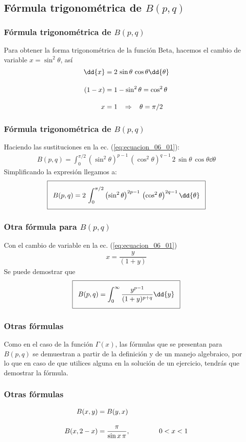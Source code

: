 \subsection{Fórmula trigonométrica de \texorpdfstring{$B(p,q)$}{B(p, q)}}
\begin{frame}
\frametitle{Fórmula trigonométrica de $B(p,q)$}
Para obtener la forma trigonométrica de la función Beta, hacemos el cambio de variable $x = \sin^{2} \theta$, así
\begin{align*}
\dd{x} &= 2 \, \sin \theta \, \cos \theta \dd{\theta} \\[1em]
(1 - x) &= 1 - \sin^{2} \theta = \cos^{2} \theta \\[1em]
x &= 1 \hspace{0.3cm} \Rightarrow \hspace{0.3cm} \theta = \pi/2
\end{align*}
\end{frame}
\begin{frame}
\frametitle{Fórmula trigonométrica de $B(p, q)$}
Haciendo las sustituciones en la ec. (\ref{eq:ecuacion_06_01}):
{\fontsize{12}{12}\selectfont
\begin{align}
B(p, q) = \int_{0}^{\pi/2} \left( \sin^{2} \theta \right)^{p-1} \, \left( \cos^{2} \theta \right)^{q-1} \, 2 \, \sin \theta \, \cos \theta \dd{\theta}
\end{align}}
\pause
Simplificando la expresión llegamos a:
{\fontsize{12}{12}\selectfont
\begin{align}
\addtolength{\fboxsep}{5pt}\boxed{B(p, q) = 2 \, \int_{0}^{\pi/2} \left( \sin^{2} \theta \right)^{2p-1} \, \left( \cos^{2} \theta \right)^{2q-1} \dd{\theta}}
\label{eq:ecuacion_06_04}
\end{align}}
\end{frame}
\begin{frame}
\frametitle{Otra fórmula para $B(p, q)$}
Con el cambio de variable en la ec. (\ref{eq:ecuacion_06_01})
\begin{align*}
x = \dfrac{y}{(1 + y)}
\end{align*}
\pause
Se puede demostrar que
\begin{align}
\addtolength{\fboxsep}{5pt}\boxed{B(p, q) = \int_{0}^{\infty} \dfrac{y^{p-1}}{(1 + y)^{p+q}} \dd{y}}
\label{eq:ecuacion_06_05}
\end{align}   
\end{frame}
\begin{frame}
\frametitle{Otras fórmulas}
Como en el caso de la función $\Gamma (x)$, las fórmulas que se presentan para $B(p, q)$ se demuestran a partir de la definición y de un manejo algebraico, por lo que en caso de que utilices alguna en la solución de un ejercicio, tendrás que demostrar la fórmula.
\end{frame}
\begin{frame}
\frametitle{Otras fórmulas}
\begin{align*}
B (x, y) &= B (y, x) \\[1em]
B (x, 2-x) &= \dfrac{\pi}{\sin x \, \pi}, \hspace{1.5cm} 0 < x < 1   
\end{align*}
\end{frame}
